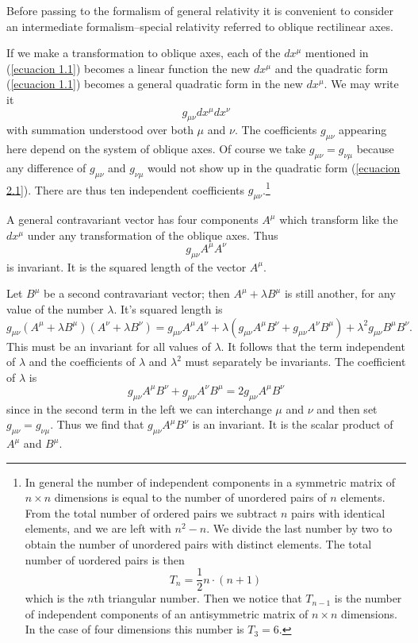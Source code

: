 Before passing to the formalism of general relativity it is convenient to 
consider an intermediate formalism--special relativity referred to oblique 
rectilinear axes.

If we make a transformation to oblique axes, each of the $dx^\mu$ mentioned in 
(\ref{ecuacion 1.1}) becomes a linear function the new $dx^\mu$ and the 
quadratic form (\ref{ecuacion 1.1}) becomes a general quadratic form in the new 
$dx^\mu$. We may write it
\begin{equation}
 \label{ecuacion 2.1}
 g_{\mu\nu} dx^\mu dx^\nu
\end{equation}
with summation understood over both $\mu$ and $\nu$. The coefficients 
$g_{\mu\nu}$ appearing here depend on the system of oblique axes. Of course we 
take $g_{\mu\nu} = g_{\nu\mu}$ because any difference of $g_{\mu\nu}$ and 
$g_{\nu\mu}$ would not show up in the quadratic form (\ref{ecuacion 2.1}). There 
are thus ten independent coefficients $g_{\mu\nu}$.\footnote{In general the 
number of independent components in a symmetric matrix of $n\times n$ dimensions 
is equal to the number of unordered pairs of $n$ elements. From the total number 
of ordered pairs we subtract $n$ pairs with identical elements, and we are left 
with $n^2 - n$. We divide the last number by two to obtain the number of 
unordered pairs with distinct elements. The total number of uordered pairs is 
then \[ T_n = \frac{1}{2} n \cdot (n+1)\] which is the $n$th triangular number. 
Then we notice that $T_{n-1}$ is the number of independent components of an 
antisymmetric matrix of $n\times n $ dimensions. In the case of four dimensions 
this number is $T_3 = 6$.}

A general contravariant vector has four components $A^\mu$ which transform like 
the $dx^\mu$ under any transformation of the oblique axes. Thus 
\[
 g_{\mu\nu} A^\mu A^\nu
\]
is invariant. It is the squared length of the vector $A^\mu$. 

Let $B^\mu$ be a second contravariant vector; then $A^\mu + \lambda B^\mu$ is 
still another, for any value of the number $\lambda$. It's squared length is
\[
 g_{\mu\nu}
 \left( A^\mu + \lambda B^\mu \right)
 \left( A^\nu + \lambda B^\nu \right)
 = g_{\mu\nu} A^\mu A^\nu 
 + \lambda \left( g_{\mu\nu} A^\mu B^\nu + g_{\mu\nu} A^\nu B^\mu \right)
 + \lambda^2 g_{\mu\nu} B^\mu B^\nu .
\]
This must be an invariant for all values of $\lambda$. It follows that the term 
independent of $\lambda$ and the coefficients of $\lambda$ and $\lambda^2$ must 
separately be invariants. The coefficient of $\lambda$ is
\[
 g_{\mu\nu} A^\mu B^\nu + g_{\mu\nu} A^\nu B^\mu = 2 g_{\mu\nu} A^\mu B^\nu
\]
since in the second term in the left we can interchange $\mu$ and $\nu$ and 
then set $g_{\mu\nu} = g_{\nu\mu}$. Thus we find that $g_{\mu\nu} A^\mu B^\nu$ 
is an invariant. It is the scalar product of $A^\mu$ and $B^\mu$.

